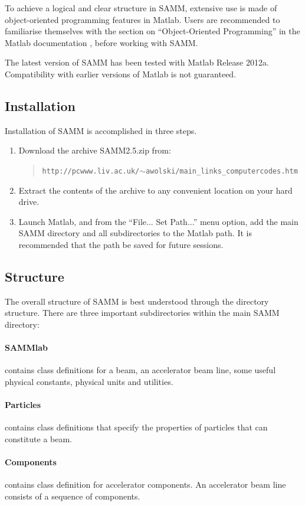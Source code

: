 \documentclass[11pt,twoside,a4paper]{article}
\begin{document}
To achieve a logical and clear structure in SAMM, extensive use is made of
object-oriented programming features in Matlab.  Users are recommended to familiarise
themselves with the section on ``Object-Oriented Programming'' in the Matlab
documentation \cite{cite:matlabdoc}, before working with SAMM.

The latest version of SAMM has been tested with Matlab Release 2012a.
Compatibility with earlier versions of Matlab is not guaranteed.

\subsection{Installation}
Installation of SAMM is accomplished in three steps.
\begin{enumerate}
\item Download the archive SAMM2.5.zip from:
\begin{quote}
\texttt{\small http://pcwww.liv.ac.uk/$\sim$awolski/main\_links\_computercodes.htm}
\end{quote}
\item Extract the contents of the archive to any convenient
location on your hard drive.
\item Launch Matlab, and from the ``File... Set Path...'' menu option, add the
main SAMM directory and all subdirectories to the Matlab path.  It is recommended
that the path be saved for future sessions.
\end{enumerate}

\subsection{Structure}
The overall structure of SAMM is best understood through the directory
structure.  There are three important subdirectories within the main SAMM
directory:
\paragraph{SAMMlab} contains class definitions for a beam, an accelerator
beam line, some useful physical constants, physical units and utilities.
\paragraph{Particles} contains class definitions that specify the properties of particles that can constitute a beam.
\paragraph{Components} contains class definition for accelerator components.
An accelerator beam line consists of a sequence of components.
\end{document}
